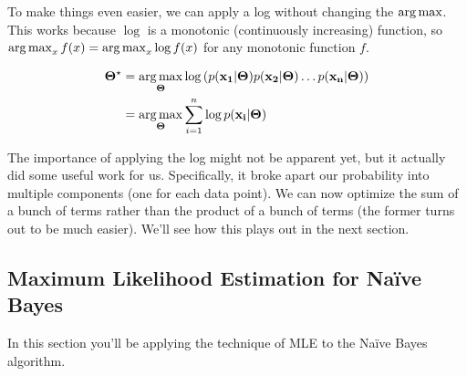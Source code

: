 \documentclass[assignment04_Solutions]{subfiles}
\begin{document}
To make things even easier, we can apply a log without changing the $\operatorname*{arg\,max}$.  This works because $\log$ is a monotonic (continuously increasing) function, so $\operatorname*{arg\,max}_x f(x) = \operatorname*{arg\,max}_x \log  f(x)$ for any monotonic function $f$.


\begin{align}
\mathbf{\Theta^\star} &= \operatorname*{arg\,max}_{\mathbf{\Theta}} \log \left ( p(\mathbf{x_1} |  \mathbf{\Theta}) p(\mathbf{x_2} | \mathbf{\Theta}) \ldots p(\mathbf{x_n} | \mathbf{\Theta})  \right) \nonumber \\
&=  \operatorname*{arg\,max}_{\mathbf{\Theta}} \sum_{i=1}^n \log p(\mathbf{x_i} |  \mathbf{\Theta})  \label{eq:mleiidlog}
\end{align}

The importance of applying the log might not be apparent yet, but it actually did some useful work for us.  Specifically, it broke apart our probability into multiple components (one for each data point).  We can now optimize the sum of a bunch of terms rather than the product  of a bunch of terms (the former turns out to be much easier).  We'll see how this plays out in the next section.

\subsection{Maximum Likelihood Estimation for Na\"ive Bayes}

In this section you'll be applying the technique of MLE to the Na\"ive Bayes algorithm.
\end{document}

